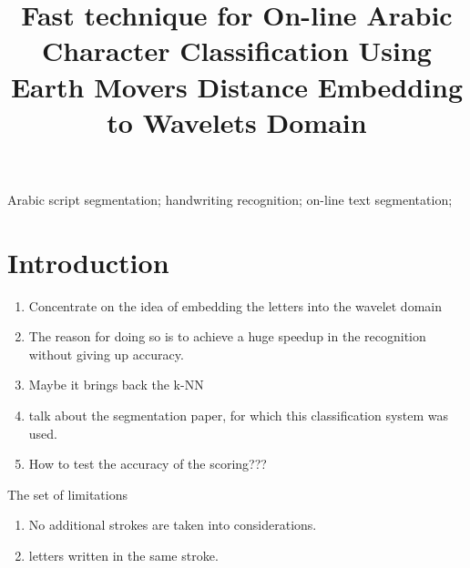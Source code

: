 \documentclass[10pt, conference, compsocconf]{IEEEtran}
\theoremstyle{definition}
\begin{document}
\title{Fast technique for On-line Arabic Character Classification Using Earth Movers Distance Embedding to Wavelets Domain}

\author{
\and
{}
}

\maketitle

\begin{abstract}

\end{abstract}

\begin{IEEEkeywords}

Arabic script segmentation; handwriting recognition; on-line text segmentation; 
\end{IEEEkeywords}

\section{Introduction}

\begin{enumerate}
\item Concentrate on the idea of embedding the letters into the wavelet domain
\item The reason for doing so is to achieve a huge speedup in the recognition without giving up accuracy.
\item Maybe it brings back the k-NN 
\item talk about the segmentation paper, for which this classification system was used.
\item How to test the accuracy of the scoring??? 
\end{enumerate}

The set of limitations
\begin{enumerate}
\item No additional strokes are taken into considerations.
\item letters written in the same stroke.
\end{enumerate}
\end{document}
